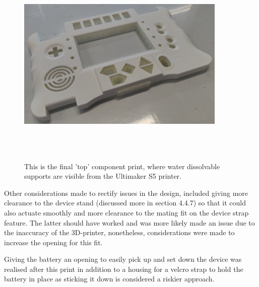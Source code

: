 \begin{figure} [h]
    \centering
    \includegraphics[width=10cm,height=10cm,keepaspectratio]{Figures/topwatersupport.png}
    \caption{This is the final 'top' component print, where water dissolvable supports are visible from the Ultimaker S5 printer.}
    \label{fig:thirdtop}
\end{figure}

Other considerations made to rectify issues in the design, included giving more clearance to the device stand (discussed more in section 4.4.7) so that it could also actuate smoothly and more clearance to the mating fit on the device strap feature.
The latter should have worked and was more likely made an issue due to the inaccuracy of the 3D-printer, nonetheless, considerations were made to increase the opening for this fit.

Giving the battery an opening to easily pick up and set down the device was realised after this print in addition to a housing for a velcro strap to hold the battery in place as sticking it down is considered a riskier approach.


